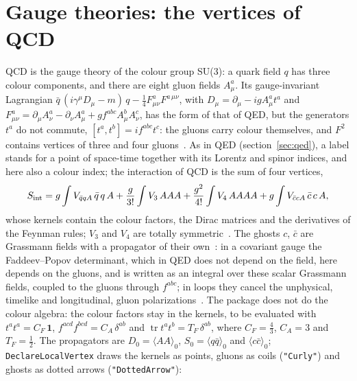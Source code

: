 \documentclass[11pt,a4paper]{article}
\newcommand{\pkg}[1]{\texttt{#1}}
\begin{document}
\section{Gauge theories: the vertices of QCD}\label{sec:qcd}

QCD is the gauge theory of the colour group SU(3): a quark field $q$ has three colour components, and there are eight
gluon fields $A^a_\mu$. Its gauge-invariant Lagrangian $\bar q\,(i\gamma^\mu D_\mu-m)\,q-\frac14F^a_{\mu\nu}F^{a\,\mu\nu}$, with
$D_\mu=\partial_\mu-igA^a_\mu t^a$ and $F^a_{\mu\nu}=\partial_\mu A^a_\nu-\partial_\nu A^a_\mu+gf^{abc}A^b_\mu A^c_\nu$, has
the form of that of QED, but the generators $t^a$ do not commute, $[t^a,t^b]=if^{abc}t^c$: the gluons carry colour
themselves, and $F^2$ contains vertices of three and four gluons~\cite[chapters~15 and 16]{PeskinSchroeder}. As in QED
(section~\ref{sec:qed}), a label stands for a point of space-time together with its Lorentz and spinor indices, and here
also a colour index; the interaction of QCD is the sum of four vertices,
\[
S_{\rm int}=g\int V_{\bar qqA}\,\bar q\,q\,A+\frac g{3!}\int V_3\,AAA+\frac{g^2}{4!}\int V_4\,AAAA
+g\int V_{\bar ccA}\,\bar c\,c\,A,
\]
whose kernels contain the colour factors, the Dirac matrices and the derivatives of the Feynman rules; $V_3$ and $V_4$
are totally symmetric~\cite{PeskinSchroeder,Muta2010}. The ghosts $c$, $\bar c$ are Grassmann fields with a propagator of their
own~\cite{FaddeevPopov1967}: in a covariant gauge the Faddeev--Popov determinant, which in QED does not depend on the
field, here depends on the gluons, and is written as an integral over these scalar Grassmann fields, coupled to the
gluons through $f^{abc}$; in loops they cancel the unphysical, timelike and longitudinal, gluon
polarizations~\cite[sections~16.2 and 16.3]{PeskinSchroeder}. The package does not do the colour algebra: the colour
factors stay in the kernels, to be evaluated with $t^at^a=C_F\,\mathbf 1$, $f^{acd}f^{bcd}=C_A\,\delta^{ab}$ and
$\operatorname{tr}t^at^b=T_F\,\delta^{ab}$, where $C_F=\frac43$, $C_A=3$ and $T_F=\frac12$. The propagators
are $D_0=\langle AA\rangle_0$, $S_0=\langle q\bar q\rangle_0$ and $\langle c\bar c\rangle_0$; \pkg{DeclareLocalVertex} draws the
kernels as points, gluons as coils (\pkg{"Curly"}) and ghosts as dotted arrows (\pkg{"DottedArrow"}):
\end{document}
